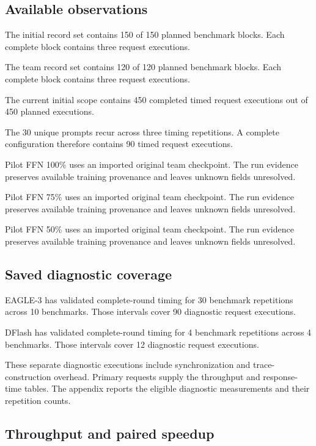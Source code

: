 \documentclass[conference,onecolumn]{IEEEtran}
\begin{document}
\subsection{Available observations}

The initial record set contains 150 of 150 planned benchmark blocks. Each complete block contains three request executions.

The team record set contains 120 of 120 planned benchmark blocks. Each complete block contains three request executions.

The current initial scope contains 450 completed timed request executions out of 450 planned executions.

The 30 unique prompts recur across three timing repetitions. A complete configuration therefore contains 90 timed request executions.

Pilot FFN 100\% uses an imported original team checkpoint. The run evidence preserves available training provenance and leaves unknown fields unresolved.

Pilot FFN 75\% uses an imported original team checkpoint. The run evidence preserves available training provenance and leaves unknown fields unresolved.

Pilot FFN 50\% uses an imported original team checkpoint. The run evidence preserves available training provenance and leaves unknown fields unresolved.

\subsection{Saved diagnostic coverage}

EAGLE-3 has validated complete-round timing for 30 benchmark repetitions across 10 benchmarks. Those intervals cover 90 diagnostic request executions.

DFlash has validated complete-round timing for 4 benchmark repetitions across 4 benchmarks. Those intervals cover 12 diagnostic request executions.

These separate diagnostic executions include synchronization and trace-construction overhead. Primary requests supply the throughput and response-time tables. The appendix reports the eligible diagnostic measurements and their repetition counts.

\subsection{Throughput and paired speedup}
\end{document}
